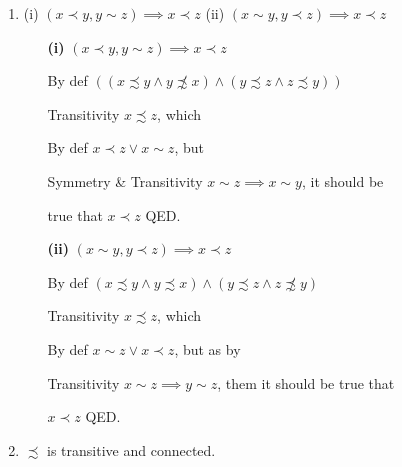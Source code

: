 \documentclass{article}
\begin{document}
\begin{enumerate}
\item (i) $(x\prec y, y\sim z)\implies x\prec z$ (ii) $(x\sim y, y\prec z)\implies
x\prec z$
\begin{enumerate}
\item[\bf (i)] $(x\prec y, y\sim z)\implies x\prec z$
\item[By def] $((x\precsim y \wedge y\not\precsim x)\wedge (y\precsim z \wedge 
z\precsim y))$
\item[Transitivity] $x\precsim z$, which 
\item[By def] $x\prec z \vee x\sim z$, but
\item[Symmetry \& Transitivity] $x\sim z\implies x\sim y$, it should be
\item[] true that $x\prec z$ QED.
\item[]
\item[\bf (ii)] $(x\sim y, y\prec z)\implies x\prec z$
\item[By def] $(x\precsim y \wedge y\precsim x) \wedge (y\precsim z\wedge
z\not\precsim y)$
\item[Transitivity] $x\precsim z$, which
\item[By def] $x\sim z \vee x\prec z$, but as by
\item[Transitivity] $x\sim z\implies y\sim z$, them it should be true that
\item[] $x\prec z$ QED.
\end{enumerate}

\item $\precsim$ is transitive and connected.
\end{enumerate}
\end{document}
